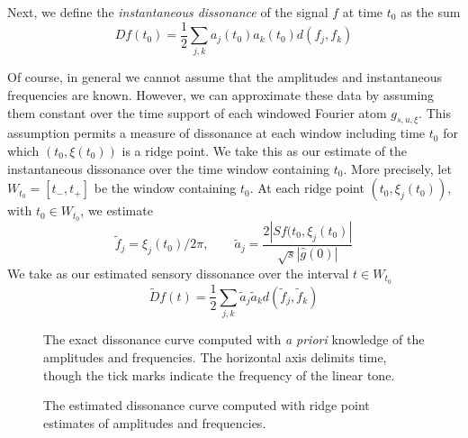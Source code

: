 Next, we define the \emph{instantaneous dissonance}
of the signal $f$ at time $t_0$ as the sum
\begin{equation}
\label{eqn:instDiss}
Df(t_0)= \frac{1}{2}\sum_{j,k}a_j(t_0)a_k(t_0)d(f_j,f_k)
\end{equation}

Of course, in general we cannot assume that the amplitudes and
instantaneous frequencies are known.  However, we can approximate
these data by assuming them constant over the time support
of each windowed Fourier atom $g_{s,u,\xi}$.  This assumption permits a 
measure of dissonance at each window including time $t_0$ for which
$(t_0,\xi(t_0))$ is a ridge point.  We take this as our estimate of
the instantaneous dissonance over the time window containing $t_0$.
More precisely, let $W_{t_0}=[t_{-},t_{+}]$ be the window containing
$t_0$.  At each ridge 
point $(t_0,\xi_j(t_0))$, with $t_0\in W_{t_0}$, we estimate 
\[
\tilde{f}_j = \xi_j(t_0)/2\pi, \qquad %
\tilde{a}_j = \frac{2|Sf(t_0,\xi_j(t_0)|}{\sqrt{s}|\hat{g}(0)|}
\]
We take as our estimated sensory dissonance over the interval
$t \in W_{t_0}$ 
\begin{equation}
\label{eqn:estDiss}
\tilde{D}f(t)= 
\frac{1}{2}\sum_{j,k}\tilde{a}_j\tilde{a}_k d(\tilde{f}_j,\tilde{f}_k)
\end{equation}

\begin{figure}
  \caption{The exact dissonance curve computed with \emph{a priori}
  knowledge of the amplitudes and frequencies.  The horizontal axis
  delimits time, though the tick marks indicate the frequency of the
  linear tone.} 
  \label{fig:analyticDiss}

  \caption{The estimated dissonance curve computed with 
  ridge point estimates of amplitudes and frequencies.}
  \label{fig:empiricalDiss}
\end{figure}


